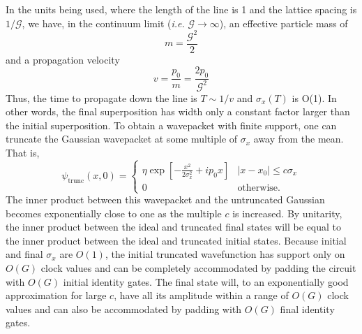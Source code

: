 \documentclass[11pt]{article}
\begin{document}
In the units being used, where the length of the line is 1 and the lattice spacing is $1/\mathcal{G}$, we have, in the continuum limit (\emph{i.e.} $\mathcal{G} \to \infty$), an effective particle mass of
\begin{equation}
m = \frac{\mathcal{G}^2}{2}
\end{equation}
and a propagation velocity
\begin{equation}
\label{velocity}
v = \frac{p_0}{m} = \frac{2 p_0}{\mathcal{G}^2}
\end{equation}
Thus, the time to propagate down the line is $T \sim 1/v$ and $\sigma_x(T)$ is O(1). In other words, the final superposition has width only a constant factor larger than the initial superposition. To obtain a wavepacket with finite support, one can truncate the Gaussian wavepacket at some multiple of $\sigma_x$ away from the mean. That is,
\begin{equation}
\psi_{\mathrm{trunc}}(x,0) = \left\{ \begin{array}{cl} 
\eta \exp \left[ - \frac{x^2}{2 \sigma_x^2} + i p_0 x \right] & |x - x_0| \leq c \sigma_x \\
0 & \textrm{otherwise.} \end{array} \right.
\end{equation}
The inner product between this wavepacket and the untruncated Gaussian becomes exponentially close to one as the multiple $c$ is increased. By unitarity, the inner product between the ideal and truncated final states will be equal to the inner product between the ideal and truncated initial states. Because initial and final $\sigma_x$ are $O(1)$, the initial truncated wavefunction has support only on $O(G)$ clock values and can be completely accommodated by padding the circuit with $O(G)$ initial identity gates. The final state will, to an exponentially good approximation for large $c$, have all its amplitude within a range of $O(G)$ clock values and can also be accommodated by padding with $O(G)$ final identity gates.
\end{document}
